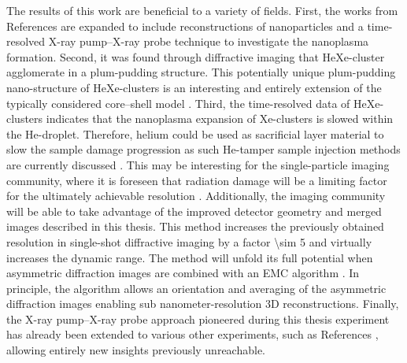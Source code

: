 The results of this work are beneficial to a variety of fields. First, the works from References \citep{Hoener-2008-JPB,Gorkhover-2016-NatPho} are expanded to include reconstructions of nanoparticles and a time-resolved X-ray pump--X-ray probe technique to investigate the nanoplasma formation. Second, it was found through diffractive imaging that HeXe-cluster agglomerate in a plum-pudding structure. This potentially unique plum-pudding nano-structure of HeXe-clusters is an interesting and entirely extension of the typically considered core--shell model \cite{Hau-Riege-2004-PRE,Hau-Riege-2007-PRL,Jurek-2008-EPJ,Jurek-2009-EPL,Hau-Riege-2010-PRL,Hoener-2008-JPB}. Third, the time-resolved data of HeXe-clusters indicates that the nanoplasma expansion of Xe-clusters is slowed within the He-droplet. Therefore, helium could be used as sacrificial layer material to slow the sample damage progression as such He-tamper sample injection methods are currently discussed \cite{Bielecki-2016-PC}. This may be interesting for the single-particle imaging community, where it is foreseen that radiation damage will be a limiting factor for the ultimately achievable resolution \citep{Aquila-2015-StrucDyn}. Additionally, the imaging community will be able to take advantage of the improved detector geometry and merged images described in this thesis. This method increases the previously obtained resolution in single-shot diffractive imaging by a factor \num{\sim 5} and virtually increases the dynamic range. The method will unfold its full potential when asymmetric diffraction images are combined with an EMC algorithm \citep{Loh-2009-PRE}. In principle, the algorithm allows an orientation and averaging of the asymmetric diffraction images enabling sub nanometer-resolution 3D reconstructions. Finally, the X-ray pump--X-ray probe approach pioneered during this thesis experiment has already been extended to various other experiments, such as References \cite{Lehmann-2016-PRA,Kimberg-2016-FD,Al-Haddad-2017-unpublished,Ferguson-2016-SciAdv,Picon-2016-NatComm}, allowing entirely new insights previously unreachable.
%
